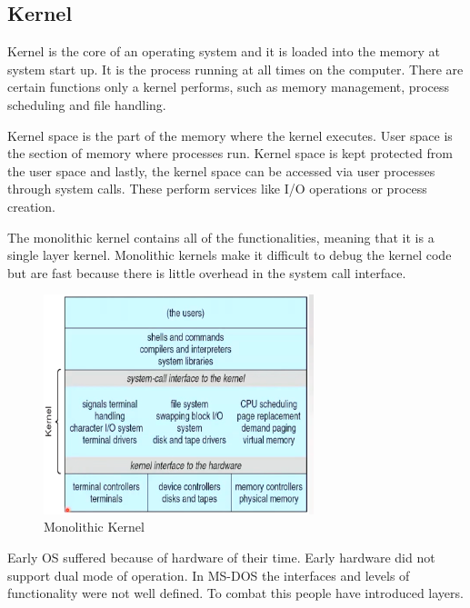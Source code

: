 \documentclass[a4paper]{article}
\theoremstyle{plain}
\theoremstyle{definition}
\newtheorem{defn}{Definition}[section]
\theoremstyle{remark}
\begin{document}
	\subsection{Kernel}
	\begin{tcolorbox}[colback=black!3!white,colframe=black!60!white,title=\begin{defn}Kernel \label{Kernel}\end{defn}]
	Kernel is the core of an operating system and it is loaded into the memory at system start up. It is the process running at all times on the computer. There are certain functions only a kernel performs, such as memory management, process scheduling and file handling.
	\end{tcolorbox}
	Kernel space is the part of the memory where the kernel executes. User space is the section of memory where processes run. Kernel space is kept protected from the user space and lastly, the kernel space can be accessed via user processes through system calls. These perform services like I/O operations or process creation.
	\begin{tcolorbox}[colback=black!3!white,colframe=black!60!white,title=\begin{defn}Monolithic Kernel \label{Monolithic Kernel}\end{defn}]
	The monolithic kernel contains all of the functionalities, meaning that it is a single layer kernel. Monolithic kernels make it difficult to debug the kernel code but are fast because there is little overhead in the system call interface.
	\begin{figure}[H]
		\centering
		\includegraphics[width=0.7\textwidth]{one.png}
		\caption{Monolithic Kernel}
		\label{fig:one-png}
	\end{figure}
	\end{tcolorbox}
	Early OS suffered because of hardware of their time. Early hardware did not support dual mode of operation. In MS-DOS the interfaces and levels of functionality were not well defined. To combat this people have introduced layers.
\end{document}
